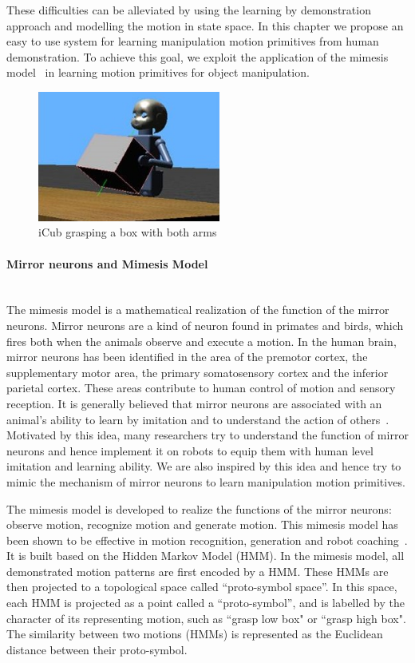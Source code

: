 These difficulties can be alleviated by using the learning by demonstration approach and modelling the motion in state space. In this chapter we propose an easy to use system for learning manipulation motion primitives from human demonstration. To achieve this goal, we exploit the application of the mimesis model~\citep{inamura2004embodied} in learning motion primitives for object manipulation.

\begin{figure}
  \centering
  \includegraphics[width=6cm]{./fig_cha5/begin.jpg}
  \caption{ \scriptsize{iCub grasping a box with both arms}
}
    \label{begin}
    \vspace{-0.5cm}
\end{figure}



\paragraph{Mirror neurons and Mimesis Model} ~\\
The mimesis model is a mathematical realization of the function of the mirror neurons. Mirror neurons are a kind of neuron found in primates and birds, which fires both when the animals observe and execute a motion. In the human brain, mirror neurons has been identified
in the area of the premotor cortex, the supplementary motor area, the primary somatosensory cortex and the inferior parietal cortex. These areas contribute to human control of motion and sensory reception. It is generally believed that mirror neurons are associated with an animal's ability to learn by imitation and to understand the action of others~\citep{rizzolatti2004mirror}. Motivated by this idea, many researchers try to understand the function of mirror neurons and hence implement it on robots to equip them with human level imitation and learning ability. We are also inspired by this idea and hence try to mimic the mechanism of mirror neurons to learn manipulation motion primitives.

The mimesis model is developed to realize the functions of the mirror neurons: observe motion, recognize motion and generate motion.
This mimesis model has been shown to be effective in motion recognition, generation and robot coaching~\citep{inamura2008geometric,okuno2011motion}. It is built based on the Hidden Markov Model (HMM).
In the mimesis model, all demonstrated motion patterns are first encoded by a HMM. These HMMs are then projected to a topological space called ``proto-symbol space''. In this space, each HMM is projected as a point called a ``proto-symbol'', and is labelled by the character of its representing motion, such as ``grasp low box" or ``grasp high box". The similarity between two motions (HMMs) is represented as the Euclidean distance between their proto-symbol.

